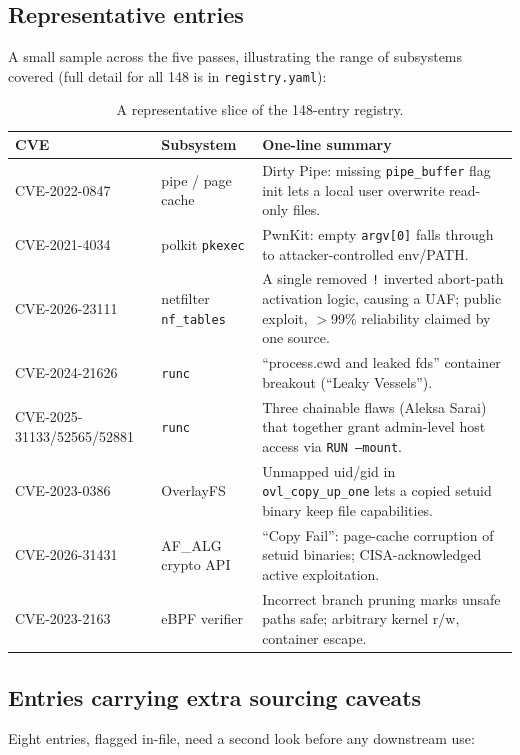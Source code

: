 \documentclass[11pt,a4paper]{article}
\begin{document}
\subsection*{Representative entries}
A small sample across the five passes, illustrating the range of
subsystems covered (full detail for all 148 is in
\texttt{registry.yaml}):

\begin{table}[h]
\centering
\scriptsize
\begin{tabular}{@{}l p{3.1cm} p{7.3cm}@{}}
\toprule
\textbf{CVE} & \textbf{Subsystem} & \textbf{One-line summary} \\
\midrule
CVE-2022-0847 & pipe / page cache & Dirty Pipe: missing \texttt{pipe\_buffer} flag init lets a local user overwrite read-only files. \\
CVE-2021-4034 & polkit \texttt{pkexec} & PwnKit: empty \texttt{argv[0]} falls through to attacker-controlled env/PATH. \\
CVE-2026-23111 & netfilter \texttt{nf\_tables} & A single removed \texttt{!} inverted abort-path activation logic, causing a UAF; public exploit, $>$99\% reliability claimed by one source. \\
CVE-2024-21626 & \texttt{runc} & ``process.cwd and leaked fds'' container breakout (``Leaky Vessels''). \\
CVE-2025-31133/52565/52881 & \texttt{runc} & Three chainable flaws (Aleksa Sarai) that together grant admin-level host access via \texttt{RUN~--mount}. \\
CVE-2023-0386 & OverlayFS & Unmapped uid/gid in \texttt{ovl\_copy\_up\_one} lets a copied setuid binary keep file capabilities. \\
CVE-2026-31431 & AF\_ALG crypto API & ``Copy Fail'': page-cache corruption of setuid binaries; CISA-acknowledged active exploitation. \\
CVE-2023-2163 & eBPF verifier & Incorrect branch pruning marks unsafe paths safe; arbitrary kernel r/w, container escape. \\
\bottomrule
\end{tabular}
\caption{A representative slice of the 148-entry registry.}
\end{table}

\subsection*{Entries carrying extra sourcing caveats}
Eight entries, flagged in-file, need a second look before any downstream
use:
\end{document}
